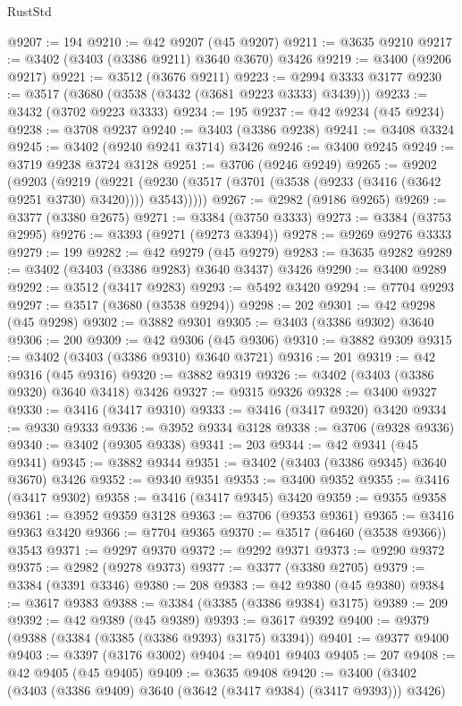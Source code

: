 \begin{lexlean}{RustStd}
\begin{coremodule}
@9207 := 194
@9210 := @42 @9207 (@45 @9207)
@9211 := @3635 @9210
@9217 := @3402 (@3403 (@3386 @9211) @3640 @3670) @3426
@9219 := @3400 (@9206 @9217)
@9221 := @3512 (@3676 @9211)
@9223 := @2994 @3333 @3177
@9230 := @3517 (@3680 (@3538 (@3432 (@3681 @9223 @3333) @3439)))
@9233 := @3432 (@3702 @9223 @3333)
@9234 := 195
@9237 := @42 @9234 (@45 @9234)
@9238 := @3708 @9237
@9240 := @3403 (@3386 @9238)
@9241 := @3408 @3324
@9245 := @3402 (@9240 @9241 @3714) @3426
@9246 := @3400 @9245
@9249 := @3719 @9238 @3724 @3128
@9251 := @3706 (@9246 @9249)
@9265 := @9202
    (@9203
      (@9219
        (@9221 (@9230 (@3517 (@3701 (@3538 (@9233 (@3416 (@3642 @9251 @3730) @3420)))) @3543)))))
@9267 := @2982 (@9186 @9265)
@9269 := @3377 (@3380 @2675)
@9271 := @3384 (@3750 @3333)
@9273 := @3384 (@3753 @2995)
@9276 := @3393 (@9271 (@9273 @3394))
@9278 := @9269 @9276 @3333
@9279 := 199
@9282 := @42 @9279 (@45 @9279)
@9283 := @3635 @9282
@9289 := @3402 (@3403 (@3386 @9283) @3640 @3437) @3426
@9290 := @3400 @9289
@9292 := @3512 (@3417 @9283)
@9293 := @5492 @3420
@9294 := @7704 @9293
@9297 := @3517 (@3680 (@3538 @9294))
@9298 := 202
@9301 := @42 @9298 (@45 @9298)
@9302 := @3882 @9301
@9305 := @3403 (@3386 @9302) @3640
@9306 := 200
@9309 := @42 @9306 (@45 @9306)
@9310 := @3882 @9309
@9315 := @3402 (@3403 (@3386 @9310) @3640 @3721)
@9316 := 201
@9319 := @42 @9316 (@45 @9316)
@9320 := @3882 @9319
@9326 := @3402 (@3403 (@3386 @9320) @3640 @3418) @3426
@9327 := @9315 @9326
@9328 := @3400 @9327
@9330 := @3416 (@3417 @9310)
@9333 := @3416 (@3417 @9320) @3420
@9334 := @9330 @9333
@9336 := @3952 @9334 @3128
@9338 := @3706 (@9328 @9336)
@9340 := @3402 (@9305 @9338)
@9341 := 203
@9344 := @42 @9341 (@45 @9341)
@9345 := @3882 @9344
@9351 := @3402 (@3403 (@3386 @9345) @3640 @3670) @3426
@9352 := @9340 @9351
@9353 := @3400 @9352
@9355 := @3416 (@3417 @9302)
@9358 := @3416 (@3417 @9345) @3420
@9359 := @9355 @9358
@9361 := @3952 @9359 @3128
@9363 := @3706 (@9353 @9361)
@9365 := @3416 @9363 @3420
@9366 := @7704 @9365
@9370 := @3517 (@6460 (@3538 @9366)) @3543
@9371 := @9297 @9370
@9372 := @9292 @9371
@9373 := @9290 @9372
@9375 := @2982 (@9278 @9373)
@9377 := @3377 (@3380 @2705)
@9379 := @3384 (@3391 @3346)
@9380 := 208
@9383 := @42 @9380 (@45 @9380)
@9384 := @3617 @9383
@9388 := @3384 (@3385 (@3386 @9384) @3175)
@9389 := 209
@9392 := @42 @9389 (@45 @9389)
@9393 := @3617 @9392
@9400 := @9379 (@9388 (@3384 (@3385 (@3386 @9393) @3175) @3394))
@9401 := @9377 @9400
@9403 := @3397 (@3176 @3002)
@9404 := @9401 @9403
@9405 := 207
@9408 := @42 @9405 (@45 @9405)
@9409 := @3635 @9408
@9420 := @3400 (@3402 (@3403 (@3386 @9409) @3640 (@3642 (@3417 @9384) (@3417 @9393))) @3426)

\end{coremodule}
\end{lexlean}

